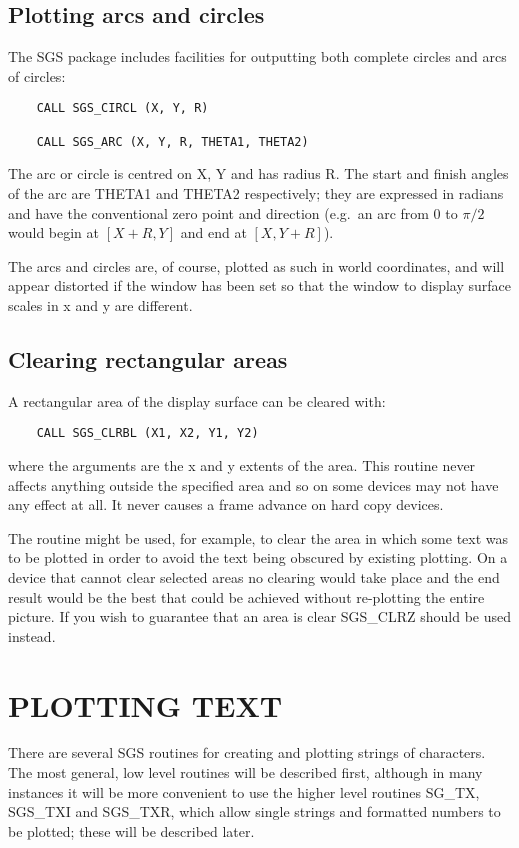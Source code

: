\subsection {Plotting arcs and circles}
The SGS package includes facilities for outputting both complete
circles and arcs of circles:
\begin{verbatim}
    CALL SGS_CIRCL (X, Y, R)

    CALL SGS_ARC (X, Y, R, THETA1, THETA2)
\end{verbatim}
The arc or circle is centred on X, Y and has radius R.  The start and
finish angles of the arc are THETA1 and THETA2 respectively;  they are
expressed in radians and have the conventional zero point and direction
(e.g.\ an arc from 0 to $\pi/2$ would begin at $[X+R,Y]$ and end at $[X,Y+R]$).

The arcs and circles are, of course, plotted as such in
world coordinates, and will appear
distorted if the window has been set so that the
window to display surface scales in
x and y are different.

\subsection {Clearing rectangular areas}\label{sec-clr-rect}
A rectangular area of the display surface can be cleared with:
\begin{verbatim}
    CALL SGS_CLRBL (X1, X2, Y1, Y2)
\end{verbatim}
where the arguments are the x and y extents of the area.  This routine never
affects anything outside the specified area and so on some devices may not
have any effect at all.  It never causes a frame advance on hard copy devices.

The routine might be used, for example, to clear the area in which some text
was to be plotted in order to avoid the text being obscured by existing
plotting.  On a device that cannot clear selected areas no clearing would
take place and the end result would be the best that could be achieved without
re-plotting the entire picture.
If you wish to guarantee that an area is clear SGS\_CLRZ should be used instead.

\section {PLOTTING TEXT}

There are several SGS routines for creating and plotting
strings of characters.  The most general, low level routines
will be described first, although in many instances it will be
more convenient to use the higher level routines SG\_TX, SGS\_TXI and
SGS\_TXR, which allow single strings and formatted numbers to be
plotted;  these will be described later.

